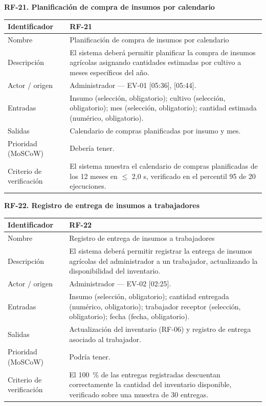 \documentclass[12pt,a4paper]{article}
\begin{document}
\bigskip
\noindent\textbf{RF-21. Planificación de compra de insumos por calendario}
\label{tab:RF-21}

\begin{center}
\begin{longtable}{|p{3.5cm}|p{10.7cm}|}
\hline
Identificador & RF-21 \\
\hline
Nombre & Planificación de compra de insumos por calendario \\
\hline
Descripción & El sistema deberá permitir planificar la compra de insumos agrícolas asignando cantidades estimadas por cultivo a meses específicos del año. \\
\hline
Actor / origen & Administrador --- EV-01 [05:36], [05:44]. \\
\hline
Entradas & Insumo (selección, obligatorio); cultivo (selección, obligatorio); mes (selección, obligatorio); cantidad estimada (numérico, obligatorio). \\
\hline
Salidas & Calendario de compras planificadas por insumo y mes. \\
\hline
Prioridad (MoSCoW) & Debería tener. \\
\hline
Criterio de verificación & El sistema muestra el calendario de compras planificadas de los 12 meses en $\leq$ 2,0 s, verificado en el percentil 95 de 20 ejecuciones. \\
\hline
\end{longtable}
\end{center}

\bigskip
\noindent\textbf{RF-22. Registro de entrega de insumos a trabajadores}
\label{tab:RF-22}

\begin{center}
\begin{longtable}{|p{3.5cm}|p{10.7cm}|}
\hline
Identificador & RF-22 \\
\hline
Nombre & Registro de entrega de insumos a trabajadores \\
\hline
Descripción & El sistema deberá permitir registrar la entrega de insumos agrícolas del administrador a un trabajador, actualizando la disponibilidad del inventario. \\
\hline
Actor / origen & Administrador --- EV-02 [02:25]. \\
\hline
Entradas & Insumo (selección, obligatorio); cantidad entregada (numérico, obligatorio); trabajador receptor (selección, obligatorio); fecha (fecha, obligatorio). \\
\hline
Salidas & Actualización del inventario (RF-06) y registro de entrega asociado al trabajador. \\
\hline
Prioridad (MoSCoW) & Podría tener. \\
\hline
Criterio de verificación & El 100~\% de las entregas registradas descuentan correctamente la cantidad del inventario disponible, verificado sobre una muestra de 30 entregas. \\
\hline
\end{longtable}
\end{center}
\end{document}
